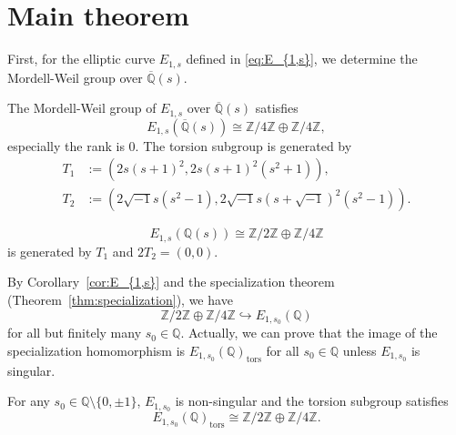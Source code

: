 \documentclass[main]{subfiles}
\begin{document}
\section{Main theorem}
First, for the elliptic curve $E_{1,s}$ defined in \eqref{eq:E_{1,s}}, we determine the Mordell-Weil group over $\overline{\mathbb{Q}}(s)$.

\begin{thm}
    \label{thm:E_{1,s}}
    The Mordell-Weil group of $E_{1,s}$ over $\overline{\mathbb{Q}}(s)$ satisfies
    \begin{equation*}
        E_{1,s}(\overline{\mathbb{Q}}(s)) \cong \mathbb{Z} / 4 \mathbb{Z} \oplus \mathbb{Z} / 4 \mathbb{Z},
    \end{equation*}
    especially the rank is $0$. The torsion subgroup is generated by
    \begin{align*}
        T_1 & := (2s(s+1)^2, 2s(s+1)^2(s^2+1)),                               \\
        T_2 & := (2 \sqrt{-1} s(s^2-1),2 \sqrt{-1} s(s+\sqrt{-1})^2(s^2-1)).
    \end{align*}
\end{thm}

\begin{cor}
    \label{cor:E_{1,s}}
    \begin{equation*}
        E_{1,s}(\mathbb{Q}(s)) \cong \mathbb{Z} / 2 \mathbb{Z} \oplus \mathbb{Z} / 4 \mathbb{Z}
    \end{equation*}
    is generated by $T_1$ and $2T_2=(0,0)$.
\end{cor}

By Corollary~\ref{cor:E_{1,s}} and the specialization theorem (Theorem~\ref{thm:specialization}), we have
\begin{equation*}
    \mathbb{Z} / 2 \mathbb{Z} \oplus \mathbb{Z} / 4 \mathbb{Z} \hookrightarrow E_{1,s_{0}}(\mathbb{Q})
\end{equation*}
for all but finitely many $s_0 \in \mathbb{Q}$.
Actually, we can prove that the image of the specialization homomorphism is $E_{1,s_0}(\mathbb{Q})_{\text{tors}}$ for all $s_0 \in \mathbb{Q}$ unless $E_{1,s_0}$ is singular.

\begin{thm}
    \label{thm:E_{1,s_0}}
    For any $s_0 \in \mathbb{Q} \setminus \{0,\pm 1 \}$, $E_{1,s_0}$ is non-singular and the torsion subgroup satisfies
    \begin{equation*}
        E_{1,s_{0}}(\mathbb{Q})_{\text{tors}} \cong \mathbb{Z} / 2 \mathbb{Z} \oplus \mathbb{Z} / 4 \mathbb{Z}.
    \end{equation*}
\end{thm}
\end{document}
